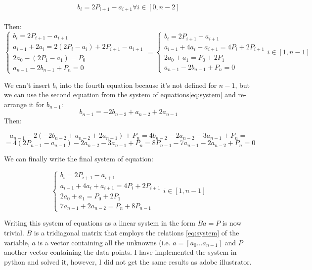 \documentclass[12pt]{article}
\begin{document}
$$b_i = 2 P_{i+1} - a_{i+1} \forall i \in [0, n-2]$$  \\
Then: \\
$$
\begin{cases}
b_i = 2 P_{i+1} - a_{i+1} \\
a_{i-1} + 2 a_i = 2 (2 P_i - a_i) + 2 P_{i+1} - a_{i+1}  \\
2 a_0 - (2 P_{1} - a_{1}) = P_0  \\
a_{n-1} -2 b_{n-1} + P_{n} = 0
\end{cases}
=
\begin{cases}
b_i = 2 P_{i+1} - a_{i+1} \\
a_{i-1} + 4 a_i + a_{i+1}= 4 P_i + 2 P_{i+1}  \\
2 a_0 + a_1 = P_0 + 2 P_1  \\
a_{n-1} -2 b_{n-1} + P_{n} = 0
\end{cases}
i \in [1, n-1]
$$

We can't insert $b_i$ into the fourth equation because it's not defined for $n-1$, but we can use the second equation from the system of equations\ref{eq:system} and re-arrange it for $b_{n-1}$: \\

$$
b_{n-1} = - 2 b_{n-2} + a_{n-2} + 2 a_{n-1}
$$
Then:

$$
a_{n-1} -2 (- 2 b_{n-2} + a_{n-2} + 2 a_{n-1}) + P_{n} = 4 b_{n-2} -2 a_{n-2} -3 a_{n-1} + P_{n} =
$$
$$ =4 (2 P_{n-1} - a_{n-1}) -2 a_{n-2} -3 a_{n-1} + P_{n} = 8 P_{n-1} - 7 a_{n-1} -2 a_{n-2} + P_n = 0$$

We can finally write the final system of equation:

\begin{equation}
\begin{cases}
b_i = 2 P_{i+1} - a_{i+1} \\
a_{i-1} + 4 a_i + a_{i+1}= 4 P_i + 2 P_{i+1}  \\
2 a_0 + a_1 = P_0 + 2 P_1  \\
7 a_{n-1} + 2 a_{n-2} = P_n + 8 P_{n-1}
\end{cases}
i \in [1, n-1]
\label{eq:final}
\end{equation}


Writing this system of equations as a linear system in the form $B a = P$ is now trivial. $B$ is a tridiagonal matrix that employs the relations \ref{eq:system} of the variable, $a$ is a vector containing all the unknowns (i.e. $a = [a_0 ... a_{n-1}]$ and $P$ another vector containing the data points. I have implemented the system in python and solved it, however, I did not get the same results as adobe illustrator. \\
\end{document}
